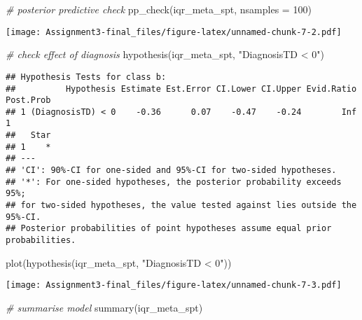\documentclass[
]{article}
\newenvironment{Shaded}{\begin{snugshade}}{\end{snugshade}}
\newcommand{\AttributeTok}[1]{\textcolor[rgb]{0.77,0.63,0.00}{#1}}
\newcommand{\CommentTok}[1]{\textcolor[rgb]{0.56,0.35,0.01}{\textit{#1}}}
\newcommand{\DecValTok}[1]{\textcolor[rgb]{0.00,0.00,0.81}{#1}}
\newcommand{\FunctionTok}[1]{\textcolor[rgb]{0.00,0.00,0.00}{#1}}
\newcommand{\NormalTok}[1]{#1}
\newcommand{\StringTok}[1]{\textcolor[rgb]{0.31,0.60,0.02}{#1}}
\begin{document}
\begin{Shaded}
\begin{Highlighting}[]
\CommentTok{\# posterior predictive check}
\FunctionTok{pp\_check}\NormalTok{(iqr\_meta\_spt, }\AttributeTok{nsamples =} \DecValTok{100}\NormalTok{)}
\end{Highlighting}
\end{Shaded}

\texttt{[image: Assignment3-final\_files/figure-latex/unnamed-chunk-7-2.pdf]}

\begin{Shaded}
\begin{Highlighting}[]
\CommentTok{\# check effect of diagnosis}
\FunctionTok{hypothesis}\NormalTok{(iqr\_meta\_spt, }\StringTok{"DiagnosisTD \textless{} 0"}\NormalTok{)}
\end{Highlighting}
\end{Shaded}

\begin{verbatim}
## Hypothesis Tests for class b:
##          Hypothesis Estimate Est.Error CI.Lower CI.Upper Evid.Ratio Post.Prob
## 1 (DiagnosisTD) < 0    -0.36      0.07    -0.47    -0.24        Inf         1
##   Star
## 1    *
## ---
## 'CI': 90%-CI for one-sided and 95%-CI for two-sided hypotheses.
## '*': For one-sided hypotheses, the posterior probability exceeds 95%;
## for two-sided hypotheses, the value tested against lies outside the 95%-CI.
## Posterior probabilities of point hypotheses assume equal prior probabilities.
\end{verbatim}

\begin{Shaded}
\begin{Highlighting}[]
\FunctionTok{plot}\NormalTok{(}\FunctionTok{hypothesis}\NormalTok{(iqr\_meta\_spt, }\StringTok{"DiagnosisTD \textless{} 0"}\NormalTok{))}
\end{Highlighting}
\end{Shaded}

\texttt{[image: Assignment3-final\_files/figure-latex/unnamed-chunk-7-3.pdf]}

\begin{Shaded}
\begin{Highlighting}[]
\CommentTok{\# summarise model}
\FunctionTok{summary}\NormalTok{(iqr\_meta\_spt)}
\end{Highlighting}
\end{Shaded}
\end{document}
